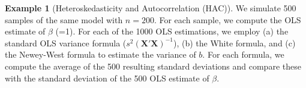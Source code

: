 \documentclass[
  12pt,
]{book}
\newenvironment{Shaded}{\begin{snugshade}}{\end{snugshade}}
\newcommand{\CommentTok}[1]{\textcolor[rgb]{0.56,0.35,0.01}{\textit{#1}}}
\newcommand{\ConstantTok}[1]{\textcolor[rgb]{0.56,0.35,0.01}{#1}}
\newcommand{\ControlFlowTok}[1]{\textcolor[rgb]{0.13,0.29,0.53}{\textbf{#1}}}
\newcommand{\DecValTok}[1]{\textcolor[rgb]{0.00,0.00,0.81}{#1}}
\newcommand{\FunctionTok}[1]{\textcolor[rgb]{0.13,0.29,0.53}{\textbf{#1}}}
\newcommand{\NormalTok}[1]{#1}
\newcommand{\OtherTok}[1]{\textcolor[rgb]{0.56,0.35,0.01}{#1}}
\newcommand{\SpecialCharTok}[1]{\textcolor[rgb]{0.81,0.36,0.00}{\textbf{#1}}}
\theoremstyle{definition}
\theoremstyle{definition}
\newtheorem{example}{Example}[chapter]
\theoremstyle{definition}
\theoremstyle{definition}
\theoremstyle{remark}
\begin{document}
\begin{example}[Heteroskedasticity and Autocorrelation (HAC)]
We simulate 500 samples of the same model with \(n=200\). For each sample, we compute the OLS estimate of \(\beta\) (=1). For each of the 1000 OLS estimations, we employ (a) the standard OLS variance formula (\(s^2 (\mathbf{X}'\mathbf{X})^{-1}\)), (b) the White formula, and (c) the Newey-West formula to estimate the variance of \(b\). For each formula, we compute the average of the 500 resulting standard deviations and compare these with the standard deviation of the 500 OLS estimate of \(\beta\).

\begin{Shaded}
\end{Shaded}
\end{example}
\end{document}
